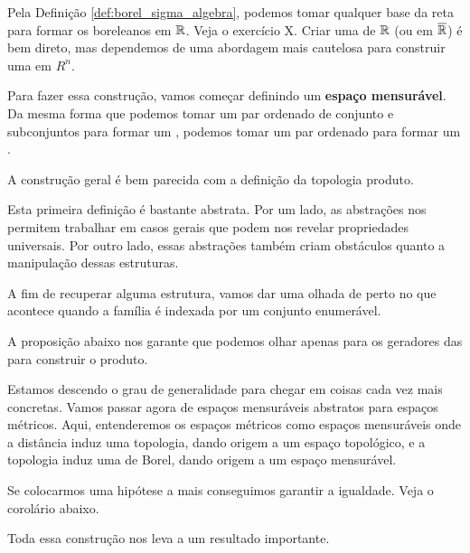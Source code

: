 \borelSigmaAlgebra

Pela Definição \ref{def:borel_sigma_algebra}, podemos tomar qualquer base da reta para formar os boreleanos em $\mathbb{R}$. Veja o exercício X. Criar uma \sigmaAlg de $\mathbb{R}$ (ou em $\overline{\mathbb{R}}$) é bem direto, mas dependemos de uma abordagem mais cautelosa para construir uma \sigmaAlg em $R^n$.

Para fazer essa construção, vamos começar definindo um \textbf{espaço mensurável}. Da mesma forma que podemos tomar um par ordenado de conjunto e subconjuntos para formar um , podemos tomar um par ordenado para formar um .

\measurableSpace

A construção geral é bem parecida com a definição da topologia produto.

\productSigmaAlgebra

Esta primeira definição é bastante abstrata. Por um lado, as abstrações nos permitem trabalhar em casos gerais que podem nos revelar propriedades universais. Por outro lado, essas abstrações também criam obstáculos quanto a manipulação dessas estruturas.

A fim de recuperar alguma estrutura, vamos dar uma olhada de perto no que acontece quando a família é indexada por um conjunto enumerável.

\productSigmaAlgebraOfCountableFamily

A proposição abaixo nos garante que podemos olhar apenas para os geradores das \sigmaAlgs para construir o produto.

\productSigmaAlgebraOfFamiliesGeneratedBySet

\productSigmaAlgebraOfCountableGeneratedFamilies

Estamos descendo o grau de generalidade para chegar em coisas cada vez mais concretas. Vamos passar agora de espaços mensuráveis abstratos para espaços métricos. Aqui, entenderemos os espaços métricos como espaços mensuráveis onde a distância induz uma topologia, dando origem a um espaço topológico, e a topologia induz uma \sigmaAlg de Borel, dando origem a um espaço mensurável.

\productSigmaAlgebraOfMetricSpaces

Se colocarmos uma hipótese a mais conseguimos garantir a igualdade. Veja o corolário abaixo.

\productSigmaAlgebraOfSeparableMetricSpaces

Toda essa construção nos leva a um resultado importante.

